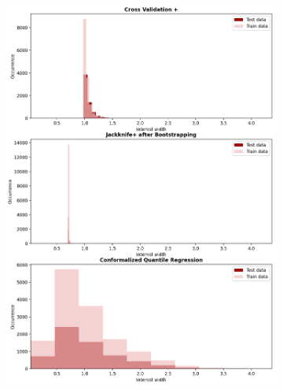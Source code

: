 \begin{figure}[ht]
\begin{subfigure}[b]{0.32\textwidth}
        \includegraphics[width=1.15\textwidth, height=2.15\textwidth]{Figures/regression/width-occurrence-regression-problem.png}

\end{subfigure}
\end{figure}
